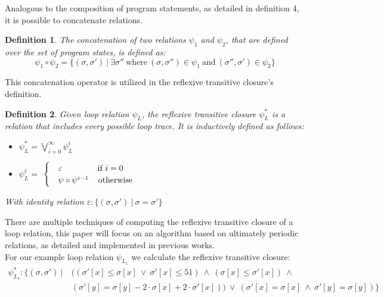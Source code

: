 \documentclass{article}
\newtheorem{mydef}{Definition}
\begin{document}
Analogous to the composition of program statements, as detailed in definition 4, it is possible to concatenate relations.
\begin{mydef}
	The concatenation of two relations $\psi_1$ and $\psi_2$, that are defined over the set of program states, is defined as:
	\begin{equation*}
		\psi_1 \circ \psi_2 = \{(\sigma, \sigma')\ |\ \exists \sigma''\ \text{where}\ (\sigma, \sigma'') \in \psi_1\ \text{and}\ (\sigma'', \sigma') \in \psi_2 \}
	\end{equation*}
\end{mydef}

This concatenation operator is utilized in the reflexive transitive closure's definition.

\begin{mydef}
	Given loop relation $\psi_L$, the reflexive transitive closure $\psi_L^*$ is a relation that includes every possible loop trace. It is inductively defined as follows:
	\begin{itemize}
		\item $\psi^*_L = \bigvee_{i=0}^\infty \psi^i_L$
		\item $\psi^i_L = $
		$\begin{cases}
			& \varepsilon \hspace{1.5cm} \text{if}\ i = 0 \\
			& \psi \circ \psi^{i - 1} \hspace{0.4cm}\text{otherwise}
		\end{cases}$
	\end{itemize}
With identity relation $\varepsilon: \{(\sigma, \sigma')\ |\ \sigma = \sigma'\}$
\end{mydef}
There are multiple techniques of computing the reflexive transitive closure of a loop relation, this paper will focus on an algorithm based on ultimately periodic relations, as detailed and implemented in previous works\cite{JillThesis}. \\

For our example loop relation  	$\psi_{L_1}$ we calculate the reflexive transitive closure:
\begin{align*}
	\psi^*_{L_1}: \{(\sigma, \sigma') \  |\ &((\sigma'[x] \leq \sigma[x]\ \lor\ \sigma'[x] \leq 51)\ \land\ (\sigma[x] \leq \sigma'[x])\ \land\ \\ & (\sigma'[y] = \sigma[y] - 2 \cdot \sigma[x] + 2\cdot \sigma'[x]))\ \lor\ (\sigma'[x] = \sigma[x]\ \land\ \sigma'[y] = \sigma[y]) \}
\end{align*}
\end{document}

